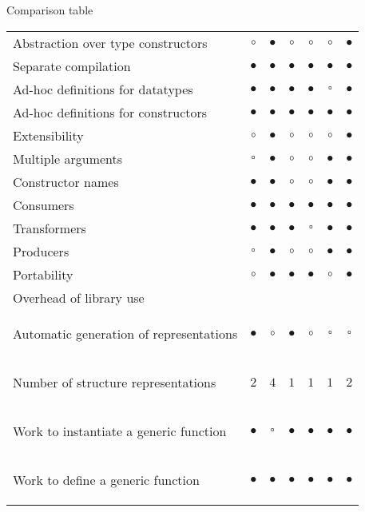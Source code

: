 \documentclass[10pt]{beamer}
\newcommand{\sufficient}{\tiny{$ \square $}}
\begin{document}
\begin{frame}{Comparison table}
\begin{table}[ht]
\begin{tabular}{l | c c c c c c}
Abstraction over type constructors & $ \circ $ & $ \bullet $ & $ \circ $ & $ \circ $ & $ \circ $ & $ \bullet $ \\
Separate compilation & $ \bullet $ & $ \bullet $ & $ \bullet $ & $ \bullet $ & $ \bullet $ & $ \bullet $ \\
Ad-hoc definitions for datatypes & $ \bullet $ & $ \bullet $ & $ \bullet $ & $ \bullet $ & \sufficient & $ \bullet $ \\
Ad-hoc definitions for constructors & $ \bullet $ & $ \bullet $ & $ \bullet $ & $ \bullet $ & $ \bullet $ & $ \bullet $ \\
Extensibility & $ \circ $ & $ \bullet $ & $ \circ $ & $ \circ $ & $ \circ $ & $ \bullet $ \\
Multiple arguments & \sufficient & $ \bullet $ & $ \circ $ & $ \circ $ & $ \bullet $ & $ \bullet $ \\
Constructor names & $ \bullet $ & $ \bullet $ & $ \circ $ & $ \circ $ & $ \bullet $ & $ \bullet $ \\
Consumers & $ \bullet $ & $ \bullet $ & $ \bullet $ & $ \bullet $ & $ \bullet $ & $ \bullet $ \\
Transformers & $ \bullet $ & $ \bullet $ & $ \bullet $ & \sufficient & $ \bullet $ & $ \bullet $ \\
Producers & \sufficient & $ \bullet $ & $ \circ $ & $ \circ $ & $ \bullet $ & $ \bullet $ \\
\hline
Portability & $ \circ $ & $ \bullet $ & $ \bullet $ & $ \bullet $ & $ \circ $ & $ \bullet $ \\
Overhead of library use & & & & & &  \\
\begin{tiny}
Automatic generation of representations
\end{tiny} & $ \bullet $ & $ \circ $ & $ \bullet $ & $ \circ $ & \sufficient & \sufficient \\
\begin{tiny}
Number of structure representations
\end{tiny} & $ 2 $ & $ 4 $ & $ 1 $ & $ 1 $ & $ 1 $ & $ 2 $ \\
\begin{tiny}
Work to instantiate a generic function
\end{tiny} & $ \bullet $ & \sufficient & $ \bullet $ & $ \bullet $ & $ \bullet $ & $ \bullet $ \\
\begin{tiny}
Work to define a generic function
\end{tiny} & $ \bullet $ & $ \bullet $ & $ \bullet $ & $ \bullet $ & $ \bullet $ & $ \bullet $ \\

\end{tabular}
\end{table}
\end{frame}
\end{document}
